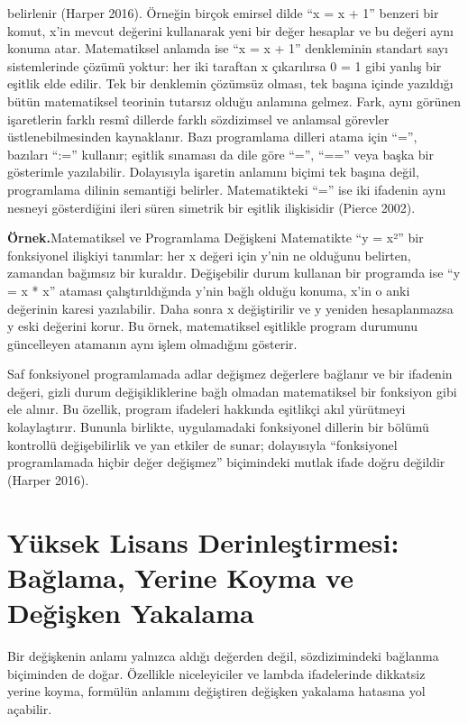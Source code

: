belirlenir (Harper 2016). Örneğin birçok emirsel dilde “x = x + 1” benzeri bir komut, x’in mevcut değerini kullanarak yeni bir değer hesaplar ve bu değeri aynı konuma atar. Matematiksel anlamda ise “x = x + 1” denkleminin standart sayı sistemlerinde çözümü yoktur: her iki taraftan x çıkarılırsa 0 = 1 gibi yanlış bir eşitlik elde edilir. Tek bir denklemin çözümsüz olması, tek başına içinde yazıldığı bütün matematiksel teorinin tutarsız olduğu anlamına gelmez. Fark, aynı görünen işaretlerin farklı resmî dillerde farklı sözdizimsel ve anlamsal görevler üstlenebilmesinden kaynaklanır. Bazı programlama dilleri atama için “=”, bazıları “:=” kullanır; eşitlik sınaması da dile göre “=”, “==” veya başka bir gösterimle yazılabilir. Dolayısıyla işaretin anlamını biçimi tek başına değil, programlama dilinin semantiği belirler. Matematikteki “=” ise iki ifadenin aynı nesneyi gösterdiğini ileri süren simetrik bir eşitlik ilişkisidir (Pierce 2002).

\begin{tcolorbox}[bookbox,colback=cEx]\textbf{\textsf{\textcolor{cAcc}{Örnek.}}}\quad Matematiksel ve Programlama Değişkeni Matematikte “y = x²” bir fonksiyonel ilişkiyi tanımlar: her x değeri için y’nin ne olduğunu belirten, zamandan bağımsız bir kuraldır. Değişebilir durum kullanan bir programda ise “y = x * x” ataması çalıştırıldığında y’nin bağlı olduğu konuma, x’in o anki değerinin karesi yazılabilir. Daha sonra x değiştirilir ve y yeniden hesaplanmazsa y eski değerini korur. Bu örnek, matematiksel eşitlikle program durumunu güncelleyen atamanın aynı işlem olmadığını gösterir.\end{tcolorbox}

Saf fonksiyonel programlamada adlar değişmez değerlere bağlanır ve bir ifadenin değeri, gizli durum değişikliklerine bağlı olmadan matematiksel bir fonksiyon gibi ele alınır. Bu özellik, program ifadeleri hakkında eşitlikçi akıl yürütmeyi kolaylaştırır. Bununla birlikte, uygulamadaki fonksiyonel dillerin bir bölümü kontrollü değişebilirlik ve yan etkiler de sunar; dolayısıyla “fonksiyonel programlamada hiçbir değer değişmez” biçimindeki mutlak ifade doğru değildir (Harper 2016).

\section{Yüksek Lisans Derinleştirmesi: Bağlama, Yerine Koyma ve Değişken Yakalama}

Bir değişkenin anlamı yalnızca aldığı değerden değil, sözdizimindeki bağlanma biçiminden de doğar. Özellikle niceleyiciler ve lambda ifadelerinde dikkatsiz yerine koyma, formülün anlamını değiştiren değişken yakalama hatasına yol açabilir.


